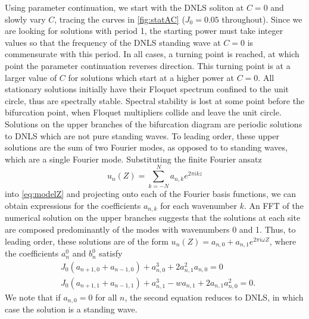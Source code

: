 \documentclass[reprint, amsmath,amssymb,aps,pre]{revtex4-2}
\begin{document}
Using parameter continuation, we start with the DNLS soliton at $C=0$ and slowly vary $C$, tracing the curves in \cref{fig:statAC} ($J_0 = 0.05$ throughout). Since we are looking for solutions with period 1, the starting power must take integer values so that the frequency of the DNLS standing wave at $C=0$ is commensurate with this period. In all cases, a turning point is reached, at which point the parameter continuation reverses direction. This turning point is at a larger value of $C$ for solutions which start at a higher power at $C=0$. All stationary solutions initially have their Floquet spectrum confined to the unit circle, thus are spectrally stable. Spectral stability is lost at some point before the bifurcation point, when Floquet multipliers collide and leave the unit circle. Solutions on the upper branches of the bifurcation diagram are periodic solutions to DNLS which are not pure standing waves. To leading order, these upper solutions are the sum of two Fourier modes, as opposed to to standing waves, which are a single Fourier mode. Substituting the finite Fourier ansatz 
\[
u_n(Z) = \sum_{k=-N}^N a_{n,k} e^{2 \pi i k z}
\]
into \cref{eq:modelZ} and projecting onto each of the Fourier basis functions, we can obtain expressions for the coefficients $a_{n,k}$ for each wavenumber $k$. An FFT of the numerical solution on the upper branches suggests that the solutions at each site are composed predominantly of the modes with wavenumbers 0 and 1. Thus, to leading order, these solutions are of the form $u_n(Z) = a_{n,0} + a_{n,1} e^{2 \pi i \omega Z}$, where the coefficients $a_n^0$ and $b_n^0$ satisfy 
\begin{align*}
&J_0(a_{n+1,0}+a_{n-1,0}) + a_{n,0}^3 + 2 a_{n,1}^2 a_{n,0} = 0 \\
&J_0(a_{n+1,1}+a_{n-1,1}) + a_{n,1}^3 - w a_{n,1} + 2 a_{n,1} a_{n,0}^2 = 0.
\end{align*}
We note that if $a_{n,0} = 0$ for all $n$, the second equation reduces to DNLS, in which case the solution is a standing wave.
\end{document}
